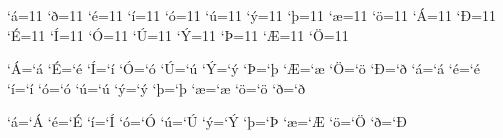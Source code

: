 %
%


\catcode`^^e1=11
\catcode`^^f0=11
\catcode`^^e9=11
\catcode`^^ed=11
\catcode`^^f3=11
\catcode`^^fa=11
\catcode`^^fd=11
\catcode`^^fe=11
\catcode`^^e6=11
\catcode`^^f6=11
\catcode`^^c1=11
\catcode`^^d0=11
\catcode`^^c9=11
\catcode`^^cd=11
\catcode`^^d3=11
\catcode`^^da=11
\catcode`^^dd=11
\catcode`^^de=11
\catcode`^^c6=11
\catcode`^^d6=11

\lccode`^^c1=`^^e1
\lccode`^^c9=`^^e9
\lccode`^^cd=`^^ed
\lccode`^^d3=`^^f3
\lccode`^^da=`^^fa
\lccode`^^dd=`^^fd
\lccode`^^de=`^^fe
\lccode`^^c6=`^^e6
\lccode`^^d6=`^^f6
\lccode`^^d0=`^^f0
\lccode`^^e1=`^^e1
\lccode`^^e9=`^^e9
\lccode`^^ed=`^^ed
\lccode`^^f3=`^^f3
\lccode`^^fa=`^^fa
\lccode`^^fd=`^^fd
\lccode`^^fe=`^^fe
\lccode`^^e6=`^^e6
\lccode`^^f6=`^^f6
\lccode`^^f0=`^^f0

\uccode`^^e1=`^^c1
\uccode`^^e9=`^^c9
\uccode`^^ed=`^^cd
\uccode`^^f3=`^^d3
\uccode`^^fa=`^^da
\uccode`^^fd=`^^dd
\uccode`^^fe=`^^de
\uccode`^^e6=`^^c6
\uccode`^^f6=`^^d6
\uccode`^^f0=`^^d0

